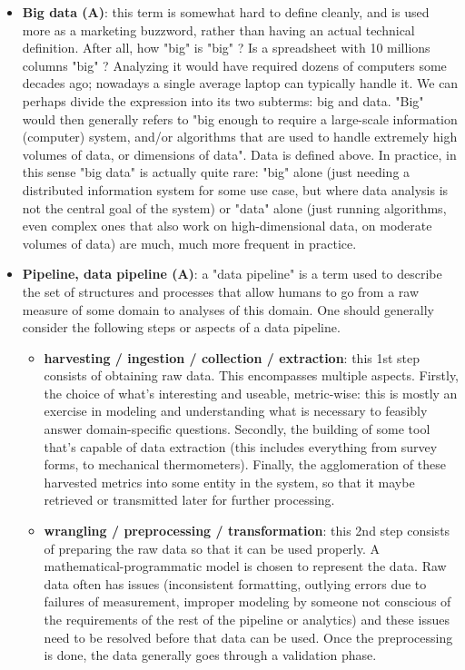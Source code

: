 \documentclass{article}
\begin{document}
\begin{itemize}
	\item \textbf{Big data (A)}: this term is somewhat hard to define cleanly, and is used more as a marketing buzzword, rather than having an actual technical definition. After all, how "big" is "big" ? Is a spreadsheet with 10 millions columns "big" ? Analyzing it would have required dozens of computers some decades ago; nowadays a single average laptop can typically handle it. We can perhaps divide the expression into its two subterms: big and data. "Big" would then generally refers to "big enough to require a large-scale information (computer) system, and/or algorithms that are used to handle extremely high volumes of data, or dimensions of data". Data is defined above. In practice, in this sense "big data" is actually quite rare: "big" alone (just needing a distributed information system for some use case, but where data analysis is not the central goal of the system) or "data" alone (just running algorithms, even complex ones that also work on high-dimensional data, on moderate volumes of data) are much, much more frequent in practice.

	\item \textbf{Pipeline, data pipeline (A)}: a "data pipeline" is a term used to describe the set of structures and processes that allow humans to go from a raw measure of some domain to analyses of this domain. One should generally consider the following steps or aspects of a data pipeline.
	\begin{itemize}
		\item \textbf{harvesting / ingestion / collection / extraction}: this 1st step consists of obtaining raw data. This encompasses multiple aspects. Firstly, the choice of what's interesting and useable, metric-wise: this is mostly an exercise in modeling and understanding what is necessary to feasibly answer domain-specific questions. Secondly, the building of some tool that's capable of data extraction (this includes everything from survey forms, to mechanical thermometers). Finally, the agglomeration of these harvested metrics into some entity in the system, so that it maybe retrieved or transmitted later for further processing.

		\item \textbf{wrangling / preprocessing / transformation}: this 2nd step consists of preparing the raw data so that it can be used properly. A mathematical-programmatic model is chosen to represent the data. Raw data often has issues (inconsistent formatting, outlying errors due to failures of measurement, improper modeling by someone not conscious of the requirements of the rest of the pipeline or analytics) and these issues need to be resolved before that data can be used. Once the preprocessing is done, the data generally goes through a validation phase.


\end{itemize}
\end{itemize}
\end{document}
